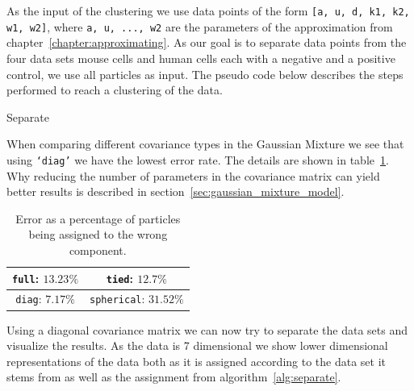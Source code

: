 As the input of the clustering we use data points of the form \mbox{\texttt{[a, u, d, k1, k2, w1, w2]}}, where \texttt{a, u, ..., w2} are the parameters of the approximation from chapter~\ref{chapter:approximating}. As our goal is to separate data points from the four data sets mouse cells and human cells each with a negative and a positive control, we use all particles as input. The pseudo code below describes the steps performed to reach a clustering of the data.

\begin{algorithm}[H] \label{alg:separate}
	\SetAlgoLined
	\DontPrintSemicolon
	\LinesNumbered
	\caption{Separate}
	
	
	\BlankLine
\end{algorithm}

When comparing different covariance types in the Gaussian Mixture we see that using \texttt{‘diag’} we have the lowest error rate. The details are shown in table~\ref{tab:covariance_type_comparison}. Why reducing the number of parameters in the covariance matrix can yield better results is described in section~\ref{sec:gaussian_mixture_model}.

\begin{table}[h!]
	\centering
	\begin{tabular}{|c|c|}
		\hline
		\texttt{full}: $13.23\%$ & \texttt{tied}: $12.7\%$ \\
		\hline
		\texttt{diag}: $7.17\%$ & \texttt{spherical}: $31.52\%$ \\
		\hline
	\end{tabular}
	\caption{Error as a percentage of particles being assigned to the wrong component.}
	\label{tab:covariance_type_comparison}
\end{table}

Using a diagonal covariance matrix we can now try to separate the data sets and visualize the results. As the data is 7 dimensional we show lower dimensional representations of the data both as it is assigned according to the data set it stems from as well as the assignment from algorithm~\ref{alg:separate}.


